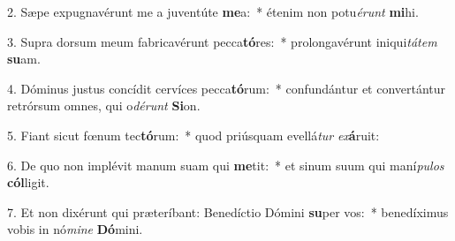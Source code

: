 2. Sæpe expugnavérunt me a juventúte \textbf{me}a:~*  étenim non potu\textit{é}\textit{runt} \textbf{mi}hi.\

3. Supra dorsum meum fabricavérunt pecca\textbf{tó}res:~*  prolongavérunt iniqui\textit{tá}\textit{tem} \textbf{su}am.\

4. Dóminus justus concídit cervíces pecca\textbf{tó}rum:~*  confundántur et convertántur retrórsum omnes, qui o\textit{dé}\textit{runt} \textbf{Si}on.\

5. Fiant sicut fœnum tec\textbf{tó}rum:~*  quod priúsquam evellá\textit{tur} \textit{ex}\textbf{á}ruit:\

6. De quo non implévit manum suam qui \textbf{me}tit:~*  et sinum suum qui maní\textit{pu}\textit{los} \textbf{cól}ligit.\

7. Et non dixérunt qui præteríbant: Benedíctio Dómini \textbf{su}per vos:~*  benedíximus vobis in nó\textit{mi}\textit{ne} \textbf{Dó}mini.\

